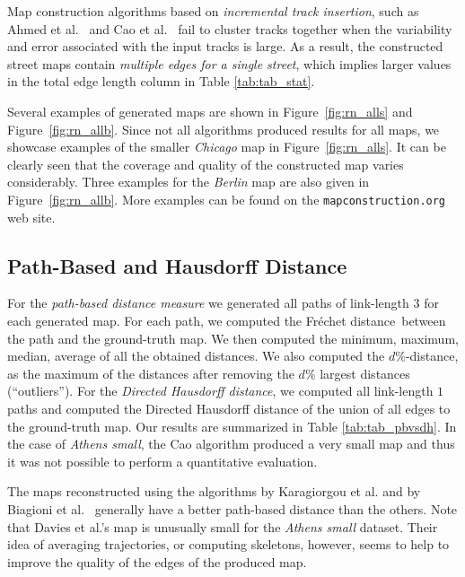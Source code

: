 \documentclass[natbib]{svjour3}                    \smartqed  \usepackage[table]{xcolor}
\newcommand{\Frd}{Fr\'echet distance}
\begin{document}
Map construction algorithms based on \emph{incremental track insertion}, such as Ahmed et al.\ \cite{csm_esa2012} and Cao et al.\ \cite{Cao:2009:GTR:1653771.1653776} fail to cluster tracks together when the variability and error associated with the input tracks is large. As a result, the constructed street maps contain \emph{multiple edges for a single street}, which implies larger values in the total edge length column in Table \ref{tab:tab_stat}.

Several examples of generated maps are shown in Figure~\ref{fig:rn_alls} and Figure~\ref{fig:rn_allb}. Since not all algorithms produced results for all maps, we showcase examples of the smaller \emph{Chicago} map in Figure~\ref{fig:rn_alls}. It can be clearly seen that the coverage and quality of the constructed map varies considerably. Three examples for the \emph{Berlin} map are also given in Figure~\ref{fig:rn_allb}. More examples can be found on the {\tt mapconstruction.org} web site.

\subsection{Path-Based and Hausdorff Distance} 
\label{sub:distance}

For the \emph{path-based distance measure} we generated all paths of link-length $3$ for each generated map. For each path, we computed the \Frd\ between the path and the ground-truth map. We then computed the minimum, maximum, median, average of all the obtained distances. We also computed the $d\%$-distance, as the maximum of the distances after removing the $d\%$ largest distances (``outliers'').
For the \emph{Directed Hausdorff distance}, we computed all link-length $1$ paths and computed the Directed Hausdorff distance of the union of all edges to the ground-truth map. Our results are summarized in Table \ref{tab:tab_pbvsdh}. 
In the case of \emph{Athens small}, the Cao algorithm produced a very small map and thus it was not possible to perform a quantitative evaluation. 

The maps reconstructed using the algorithms by Karagiorgou et al. \cite{Karagiorgou:2012:VTD:2424321.2424334} and by  Biagioni et al.\ \cite{be-irmgp-12,Biagioni:2012:MIF:2424321.2424333} generally have a better path-based distance than the others. Note that Davies et al.'s \cite{Davies:2006:SDR:1175887.1176088} map is unusually small for the \emph{Athens small} dataset. Their idea of averaging trajectories, or computing skeletons, however, seems to help to improve the quality of the edges of the produced map. 
\end{document}
